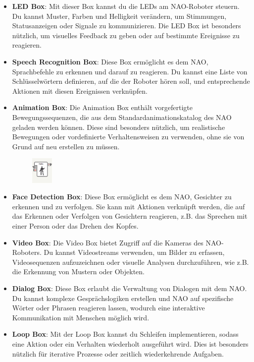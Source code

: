 \begin{itemize}
    \item \textbf{LED Box}: Mit dieser Box kannst du die LEDs am NAO-Roboter steuern. Du kannst Muster, Farben und Helligkeit verändern, um Stimmungen, Statusanzeigen oder Signale zu kommunizieren. Die LED Box ist besonders nützlich, um visuelles Feedback zu geben oder auf bestimmte Ereignisse zu reagieren.
    \item \textbf{Speech Recognition Box}: Diese Box ermöglicht es dem NAO, Sprachbefehle zu erkennen und darauf zu reagieren. Du kannst eine Liste von Schlüsselwörtern definieren, auf die der Roboter hören soll, und entsprechende Aktionen mit diesen Ereignissen verknüpfen.
    \item \textbf{Animation Box}: Die Animation Box enthält vorgefertigte Bewegungssequenzen, die aus dem Standardanimationskatalog des NAO geladen werden können. Diese sind besonders nützlich, um realistische Bewegungen oder vordefinierte Verhaltensweisen zu verwenden, ohne sie von Grund auf neu erstellen zu müssen.
    \begin{figure}[h]
        \centering
        \includegraphics[width=0.1\textwidth]{../images/animationBox.png}
        \label{fig:animationBox}
    \end{figure} 
    \item \textbf{Face Detection Box}: Diese Box ermöglicht es dem NAO, Gesichter zu erkennen und zu verfolgen. Sie kann mit Aktionen verknüpft werden, die auf das Erkennen oder Verfolgen von Gesichtern reagieren, z.B. das Sprechen mit einer Person oder das Drehen des Kopfes.
    \item \textbf{Video Box}: Die Video Box bietet Zugriff auf die Kameras des NAO-Roboters. Du kannst Videostreams verwenden, um Bilder zu erfassen, Videosequenzen aufzuzeichnen oder visuelle Analysen durchzuführen, wie z.B. die Erkennung von Mustern oder Objekten.
    \item \textbf{Dialog Box}: Diese Box erlaubt die Verwaltung von Dialogen mit dem NAO. Du kannst komplexe Gesprächslogiken erstellen und NAO auf spezifische Wörter oder Phrasen reagieren lassen, wodurch eine interaktive Kommunikation mit Menschen möglich wird.
    \item \textbf{Loop Box}: Mit der Loop Box kannst du Schleifen implementieren, sodass eine Aktion oder ein Verhalten wiederholt ausgeführt wird. Dies ist besonders nützlich für iterative Prozesse oder zeitlich wiederkehrende Aufgaben.

\end{itemize}
